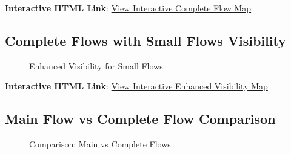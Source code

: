 \documentclass[
  11pt,
]{article}
\begin{document}
\textbf{Interactive HTML Link}:
\href{https://github.com/WilliamClintC/RER/blob/main/_output/exported_figures/07_final_flow_map_100percent_coverage.html}{View
Interactive Complete Flow Map}

\subsection{Complete Flows with Small Flows
Visibility}\label{complete-flows-with-small-flows-visibility}

\begin{figure}[H]


\caption{\label{fig-enhanced-visibility}Enhanced Visibility for Small
Flows}

\end{figure}%

\textbf{Interactive HTML Link}:
\href{https://github.com/WilliamClintC/RER/blob/main/_output/exported_figures/08_diagnostic_enhanced_visibility.html}{View
Interactive Enhanced Visibility Map}

\subsection{Main Flow vs Complete Flow
Comparison}\label{main-flow-vs-complete-flow-comparison}

\begin{figure}[H]


\caption{\label{fig-flow-comparison}Comparison: Main vs Complete Flows}

\end{figure}%
\end{document}
